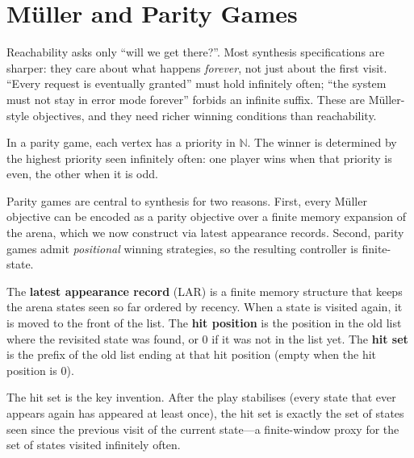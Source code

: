 \section{M\"uller and Parity Games}
\label{sec:muller-parity-games}

Reachability asks only ``will we get there?''.  Most synthesis
specifications are sharper: they care about what happens \emph{forever},
not just about the first visit.  ``Every request is eventually granted''
must hold infinitely often; ``the system must not stay in error mode
forever'' forbids an infinite suffix.  These are M\"uller-style
objectives, and they need richer winning conditions than reachability.

\begin{definition}
\label{def:parity-condition}
In a parity game, each vertex has a priority in $\mathbb{N}$.  The
winner is determined by the highest priority seen infinitely often:
one player wins when that priority is even, the other when it is odd.
\end{definition}

Parity games are central to synthesis for two reasons.  First, every
M\"uller objective can be encoded as a parity objective over a finite
memory expansion of the arena, which we now construct via latest
appearance records.  Second, parity games admit \emph{positional}
winning strategies, so the resulting controller is finite-state.

\begin{definition}
\label{def:lar}
The \textbf{latest appearance record} (LAR) is a finite memory structure
that keeps the arena states seen so far ordered by recency.  When a
state is visited again, it is moved to the front of the list.  The
\textbf{hit position} is the position in the old list where the
revisited state was found, or $0$ if it was not in the list yet.  The
\textbf{hit set} is the prefix of the old list ending at that hit
position (empty when the hit position is $0$).
\end{definition}

The hit set is the key invention.  After the play stabilises (every
state that ever appears again has appeared at least once), the hit set
is exactly the set of states seen since the previous visit of the
current state---a finite-window proxy for the set of states visited
infinitely often.

